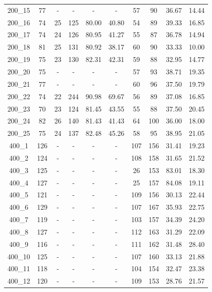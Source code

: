 \documentclass[a4paper,final]{article}
\begin{document}
\begin{longtable}[c]{cccccccccc}
200\_15 & 77  & -  & -   & -     & -     & 57  & 90  & 36.67 & 14.44 \\
200\_16 & 74  & 25 & 125 & 80.00 & 40.80 & 54  & 89  & 39.33 & 16.85 \\
200\_17 & 74  & 24 & 126 & 80.95 & 41.27 & 55  & 87  & 36.78 & 14.94 \\
200\_18 & 81  & 25 & 131 & 80.92 & 38.17 & 60  & 90  & 33.33 & 10.00 \\
200\_19 & 75  & 23 & 130 & 82.31 & 42.31 & 59  & 88  & 32.95 & 14.77 \\
200\_20 & 75  & -  & -   & -     & -     & 57  & 93  & 38.71 & 19.35 \\
200\_21 & 77  & -  & -   & -     & -     & 60  & 96  & 37.50 & 19.79 \\
200\_22 & 74  & 22 & 244 & 90.98 & 69.67 & 56  & 89  & 37.08 & 16.85 \\
200\_23 & 70  & 23 & 124 & 81.45 & 43.55 & 55  & 88  & 37.50 & 20.45 \\
200\_24                   & 82                       & 26 & 140 & 81.43        & 41.43    & 64 & 100 & 36.00        & 18.00    \\
200\_25 & 75  & 24 & 137 & 82.48 & 45.26 & 58  & 95  & 38.95 & 21.05 \\
400\_1  & 126 & -  & -   & -     & -     & 107 & 156 & 31.41 & 19.23 \\
400\_2  & 124 & -  & -   & -     & -     & 108 & 158 & 31.65 & 21.52 \\
400\_3  & 125 & -  & -   & -     & -     & 26  & 153 & 83.01 & 18.30 \\
400\_4  & 127 & -  & -   & -     & -     & 25  & 157 & 84.08 & 19.11 \\
400\_5  & 121 & -  & -   & -     & -     & 109 & 156 & 30.13 & 22.44 \\
400\_6  & 129 & -  & -   & -     & -     & 107 & 167 & 35.93 & 22.75 \\
400\_7  & 119 & -  & -   & -     & -     & 103 & 157 & 34.39 & 24.20 \\
400\_8  & 127 & -  & -   & -     & -     & 112 & 163 & 31.29 & 22.09 \\
400\_9  & 116 & -  & -   & -     & -     & 111 & 162 & 31.48 & 28.40 \\
400\_10 & 125 & -  & -   & -     & -     & 107 & 160 & 33.13 & 21.88 \\
400\_11 & 118 & -  & -   & -     & -     & 104 & 154 & 32.47 & 23.38 \\
400\_12 & 120 & -  & -   & -     & -     & 109 & 153 & 28.76 & 21.57 \\

\end{longtable}
\end{document}
